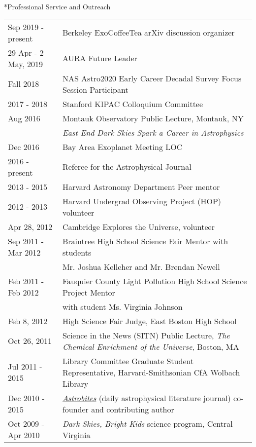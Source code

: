 \documentclass[10pt]{article}
\makeatletter
\renewcommand{\section}{\@startsection{section}{1}{0pt}{-\baselineskip}{0.5\baselineskip}{\scshape\color{myblue1}}}
\makeatother
\begin{document}
\section*{Professional Service and Outreach}
\begin{tabular*}{\textwidth}{@{\hspace{10pt}}p{1.4in}l}
Sep 2019 - present & Berkeley ExoCoffeeTea arXiv discussion organizer \\ 
29 Apr - 2 May, 2019 & AURA Future Leader \\
Fall 2018 & NAS Astro2020 Early Career Decadal Survey Focus Session Participant \\
2017 - 2018 & Stanford KIPAC Colloquium Committee \\
Aug 2016 & Montauk Observatory Public Lecture, Montauk, NY \\
&  \emph{East End Dark Skies Spark a Career in Astrophysics}\\
Dec 2016 & Bay Area Exoplanet Meeting LOC \\
2016 - present & Referee for the Astrophysical Journal \\
2013 - 2015 & Harvard Astronomy Department Peer mentor\\
2012 - 2013 & Harvard Undergrad Observing Project (HOP) volunteer\\
Apr 28, 2012 & Cambridge Explores the Universe, volunteer\\
Sep 2011 - Mar 2012 & Braintree High School Science Fair Mentor with students\\
& Mr. Joshua Kelleher and Mr. Brendan Newell\\
Feb 2011 - Feb 2012 & Fauquier County Light Pollution High School Science Project Mentor\\
& with student Ms. Virginia Johnson\\
Feb 8, 2012 & High Science Fair Judge, East Boston High School\\
Oct 26, 2011 & Science in the News (SITN) Public Lecture, \emph{The Chemical Enrichment of the Universe}, Boston, MA\\
Jul 2011 - 2015 & Library Committee Graduate Student Representative, Harvard-Smithsonian CfA Wolbach Library\\
Dec 2010 - 2015 & \href{http://astrobites.com/}{\emph{Astrobites}} (daily astrophysical literature journal) co-founder and contributing author\\
Oct 2009 - Apr 2010 & \emph{Dark Skies, Bright Kids} science program, Central Virginia\\
\end{tabular*}
\end{document}
